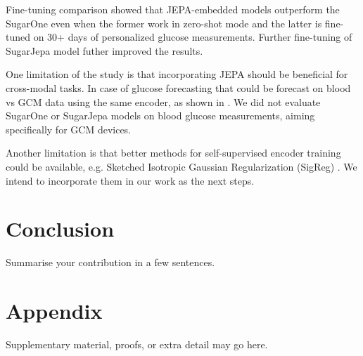 \documentclass[11pt,a4paper]{article}
\begin{document}
Fine-tuning comparison showed that JEPA-embedded models outperform the SugarOne even when the former work in zero-shot mode and the latter is fine-tuned on 30+ days of personalized glucose measurements. Further fine-tuning of SugarJepa model futher improved the results.

One limitation of the study is that incorporating JEPA should be beneficial for cross-modal tasks. In case of glucose forecasting that could be forecast on blood vs GCM data using the same encoder, as shown in \cite{muhammad2026cgm}. We did not evaluate SugarOne or SugarJepa models on blood glucose measurements, aiming specifically for GCM devices.

Another limitation is that better methods for self-supervised encoder training could be available, e.g. Sketched Isotropic Gaussian Regularization (SigReg) \cite{lecun2026lejepa}. We intend to incorporate them in our work as the next steps.

\section{Conclusion}
Summarise your contribution in a few sentences.

% 
% 




\appendix
\section{Appendix}
Supplementary material, proofs, or extra detail may go here.
\end{document}
